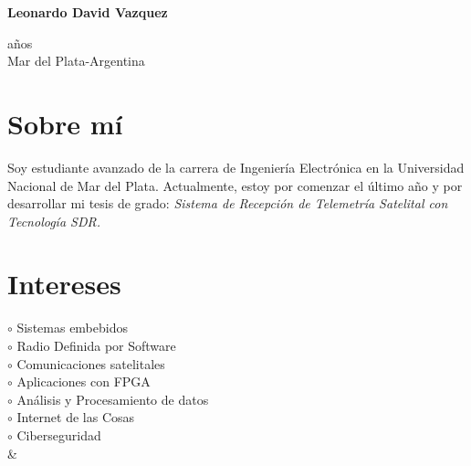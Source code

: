 \begin{adjustbox}{valign=t}
\begin{minipage}{0.34\textwidth} 
\begin{center}
\MySkip 	%
{\LARGE \bfseries Leonardo David Vazquez}
\MySkip 	%
\end{center}
 años\\
Mar del Plata-Argentina \MySkip
\raggedright
\textcolor{ColorRed}{\faEnvelopeO} 

\textcolor{ColorRed}{\faLinkedin} 

\textcolor{ColorRed}{\faGithub} 


\section*{Sobre mí}
\raggedright
Soy estudiante avanzado de la carrera de Ingeniería Electrónica en la Universidad Nacional de Mar del Plata. Actualmente, estoy por comenzar el último año y por desarrollar mi tesis de grado: {\it Sistema de Recepción de Telemetría Satelital con Tecnología SDR.}
\section*{Intereses}
\raggedright
\textcolor{ColorOne}{$\circ$} Sistemas embebidos\\
\textcolor{ColorOne}{$\circ$} Radio Definida por Software\\
\textcolor{ColorOne}{$\circ$} Comunicaciones satelitales\\
\textcolor{ColorOne}{$\circ$} Aplicaciones con FPGA\\
\textcolor{ColorOne}{$\circ$} Análisis y Procesamiento de datos\\
\textcolor{ColorOne}{$\circ$} Internet de las Cosas\\
\textcolor{ColorOne}{$\circ$} Ciberseguridad\\
&\vfill

\end{minipage}
\end{adjustbox}
